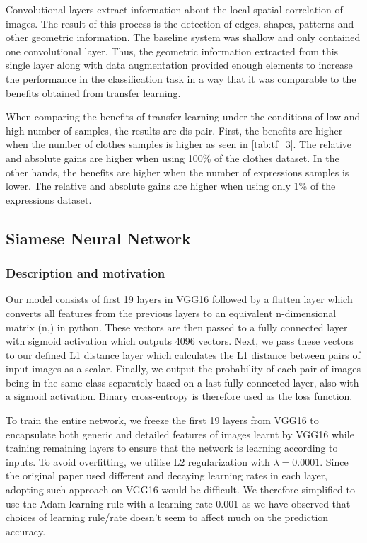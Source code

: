 \documentclass{article}
\begin{document}
Convolutional layers extract information about the local spatial correlation of images. The result of this process is the detection of edges, shapes, patterns and other geometric information. The baseline system was shallow and only contained one convolutional layer. Thus, the geometric information extracted from this single layer along with data augmentation provided enough elements to increase the performance in the classification task in a way that it was comparable to the benefits obtained from transfer learning. 

When comparing the benefits of transfer learning under the conditions of low and high number of samples, the results are dis-pair. First, the benefits are higher when the number of clothes samples is higher as seen in \ref{tab:tf_3}. The relative and absolute gains are higher when using 100\% of the clothes dataset. In the other hands, the benefits are higher when the number of expressions samples is lower. The relative and absolute gains are higher when using only 1\% of the expressions dataset.

\subsection{Siamese Neural Network}

\subsubsection{\textbf{Description and motivation}}

Our model consists of first 19 layers in VGG16 followed by a flatten layer which converts all features from the previous layers to
an equivalent n-dimensional matrix (n,) in python. These vectors are then passed to a fully connected layer with sigmoid activation which outputs 4096 vectors. Next, we pass these vectors to our defined L1 distance layer which calculates the L1 distance between pairs of input images as a scalar. Finally, we output the probability of each pair of images being in the same class separately based on a last fully connected layer, also with a sigmoid activation. Binary cross-entropy is therefore used as the loss function.

To train the entire network, we freeze the first 19 layers from VGG16 to encapsulate both generic and detailed features of images learnt by VGG16 while training remaining layers to ensure that the network is learning according to inputs. To avoid overfitting, we utilise L2 regularization with $\lambda=0.0001$. Since the original paper used different and decaying learning rates in each layer, adopting such approach on VGG16 would be difficult. We therefore simplified to use the Adam learning rule with a learning rate 0.001 as we have observed that choices of learning rule/rate doesn't seem to affect much on the prediction accuracy.
\end{document}
